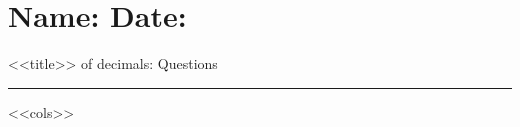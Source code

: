 \documentclass[leqno, 12pt]{article}
\def \HeadingQuestions {\section*{\Large Name: \underline{\hspace{8cm}} \hfill Date: \underline{\hspace{3cm}}} \vspace{-3mm}
{<<title>> of decimals: Questions} \vspace{1pt}\hrule}
\begin{document}
\HeadingQuestions
\vspace{-5mm}
\begin{multicols}{3}
<<cols>>
\end{multicols}
\end{document}
